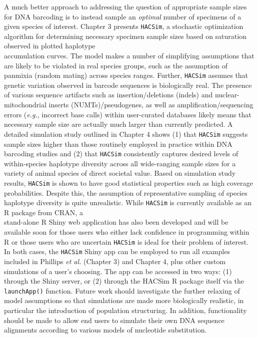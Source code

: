 A much better approach to addressing the question of appropriate sample sizes for DNA barcoding is to instead sample an \textit{optimal} number of specimens of a given species of interest. Chapter 3 presents {\tt HACSim}, a stochastic optimization algorithm for determining necessary specimen sample sizes based on saturation observed in plotted haplotype \\ accumulation curves. The model makes a number of simplifying assumptions that are likely to be violated in real species groups, such as the assumption of panmixia (random mating) across species ranges. Further, {\tt HACSim} assumes that genetic variation observed in barcode sequences is biologically real. The presence of various sequence artifacts such as insertion/deletions (indels) and nuclear-mitochondrial inserts (NUMTs)/pseudogenes, as well as amplification/sequencing errors (\textit{e.g.}, incorrect base calls) within user-curated databases likely means that necessary sample size are actually much larger than currently predicted.  A detailed simulation study outlined in Chapter 4 shows (1) that {\tt HACSim} suggests sample sizes higher than those routinely employed in practice within DNA \\ barcoding studies and (2) that {\tt HACSim} consistently captures desired levels of \\ within-species haplotype diversity across all wide-ranging sample sizes for a variety of animal species of direct societal value. Based on simulation study results, {\tt HACSim} is shown to have good statistical properties such as high coverage probabilities. Despite this, the assumption of representative sampling of species haplotype diversity is quite unrealistic. While {\tt HACSim} is currently available as an R package from CRAN, a \\ stand-alone R Shiny web application has also been developed and will be available soon for those users who either lack confidence in programming within R or those users who are uncertain {\tt HACSim} is ideal for their problem of interest. In both cases, the {\tt HACSim} Shiny app can be employed to run all examples included in Phillips \textit{et al.} \cite{phillips2020hacsim} (Chapter 3) and Chapter 4, plus other custom simulations of a user's choosing. The app can be accessed in two ways: (1) through the Shiny server, or (2) through the HACSim R package itself via the {\tt launchApp()} function. Future work should investigate the further relaxing of model assumptions so that simulations are made more biologically realistic, in particular the introduction of population structuring. In addition, functionality should be made to allow end users to simulate their own DNA sequence alignments according to various models of nucleotide substitution.

